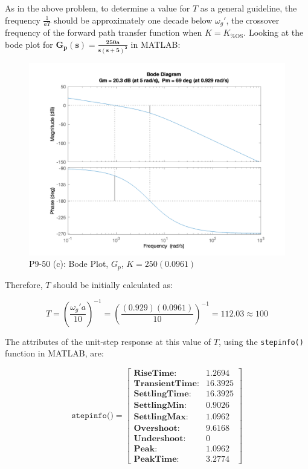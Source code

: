 \documentclass[12pt, letterpaper]{../assignment}
\begin{document}
As in the above problem, to determine a value for $T$ as a general guideline,
the frequency $\frac{1}{aT}$ should be approximately one decade below $\omega_g'$,
the crossover frequency of the forward path transfer function when $K = K_\text{\%OS}$.
Looking at the bode plot for $ \mathbf{ G_p(s) = \frac{250a}{s (s+5)^2 } } $ in MATLAB:

\begin{figure}[H]
    \centering
    \includegraphics[width=1\linewidth]{./figures/bode_prime_9_50c.png}
    \caption{P9-50 (c): Bode Plot, $G_p$, $K = 250(0.0961)$}
\end{figure}

Therefore, $T$ should be initially calculated as:

$$ T = \left(\frac{\omega_g' a}{10}\right)^{-1}
     = \left(\frac{(0.929)(0.0961)}{10}\right)^{-1}
     = 112.03 \approx 100$$

The attributes of the unit-step response at this value of $T$,
using the \texttt{stepinfo()} function in MATLAB, are:

$$ \texttt{stepinfo()} =  \left[
\begin{array}{rl}
    \textbf{RiseTime:}& 1.2694\\
    \textbf{TransientTime:}&  16.3925\\
    \textbf{SettlingTime:}&  16.3925\\
    \textbf{SettlingMin:}&  0.9026\\
    \textbf{SettlingMax:}&  1.0962\\
    \textbf{Overshoot:}&  9.6168\\
    \textbf{Undershoot:}&  0\\
    \textbf{Peak:}&  1.0962\\
    \textbf{PeakTime:}&  3.2774
\end{array} \right] $$
\end{document}

